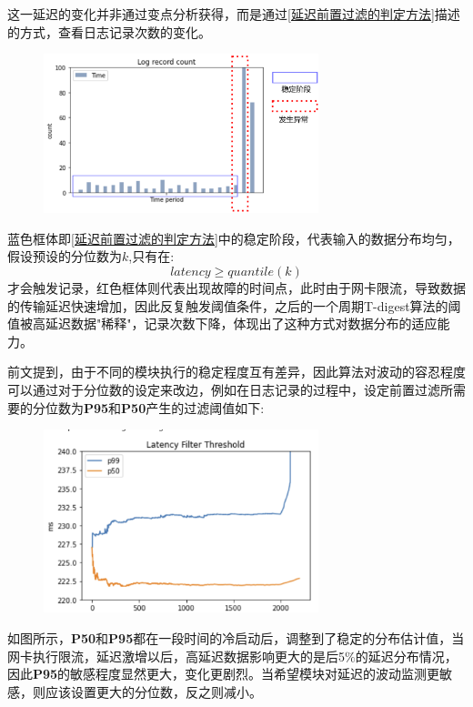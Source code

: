 \documentclass[master]{shtthesis}
\begin{document}
这一延迟的变化并非通过变点分析获得，而是通过\ref{延迟前置过滤的判定方法}描述的方式，查看日志记录次数的变化。
\begin{figure}[H]
	\centering
	\includegraphics[width=8cm]{img/error.pdf}
	\label{单位时间次数}
\end{figure}
蓝色框体即\ref{延迟前置过滤的判定方法}中的稳定阶段，代表输入的数据分布均匀，假设预设的分位数为$k$,只有在:
\begin{equation}
	latency \geq quantile(k)
\end{equation}
才会触发记录，红色框体则代表出现故障的时间点，此时由于网卡限流，导致数据的传输延迟快速增加，因此反复触发阈值条件，之后的一个周期T-digest算法的阈值被高延迟数据"稀释"，记录次数下降，体现出了这种方式对数据分布的适应能力。

前文提到，由于不同的模块执行的稳定程度互有差异，因此算法对波动的容忍程度可以通过对于分位数的设定来改边，例如在日志记录的过程中，设定前置过滤所需要的分位数为\textbf{P95}和\textbf{P50}产生的过滤阈值如下:
\begin{figure}[H]
	\centering
	\includegraphics[width=8cm]{img/dp.png}
	\label{不同分位数延迟的过滤阈值}
\end{figure}
如图所示，\textbf{P50}和\textbf{P95}都在一段时间的冷启动后，调整到了稳定的分布估计值，当网卡执行限流，延迟激增以后，高延迟数据影响更大的是后5$\%$的延迟分布情况，因此\textbf{P95}的敏感程度显然更大，变化更剧烈。当希望模块对延迟的波动监测更敏感，则应该设置更大的分位数，反之则减小。
\end{document}
